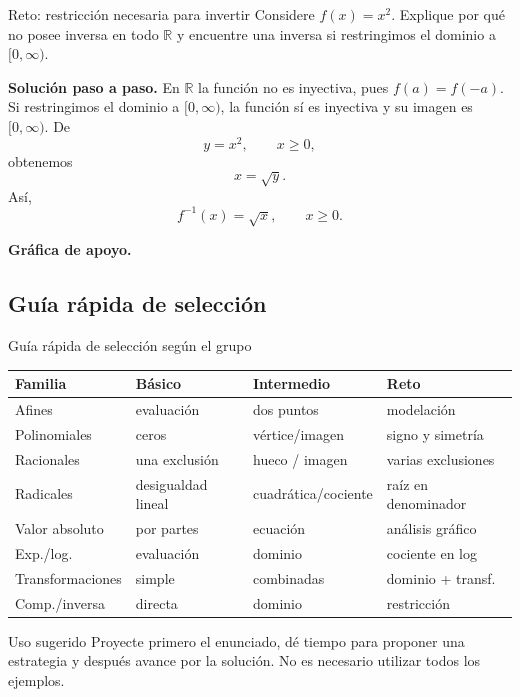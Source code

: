 \documentclass[aspectratio=169,10pt]{beamer}
\newcommand{\R}{\mathbb{R}}
\begin{document}
\begin{frame}{Reto: restricción necesaria para invertir}
Considere $f(x)=x^2$. Explique por qué no posee inversa en todo $\R$ y encuentre una inversa si restringimos el dominio a $[0,\infty)$.

\textbf{Solución paso a paso.} En $\R$ la función no es inyectiva, pues $f(a)=f(-a)$. Si restringimos el dominio a $[0,\infty)$, la función sí es inyectiva y su imagen es $[0,\infty)$. De
\[
y=x^2,\qquad x\ge0,
\]
obtenemos
\[
x=\sqrt{y}.
\]
Así,
\[
\boxed{f^{-1}(x)=\sqrt{x},\qquad x\ge0}.
\]


\textbf{Gráfica de apoyo.}\medskip
\begin{center}
\end{center}

\end{frame}

\subsection*{Guía rápida de selección}
\begin{frame}{Guía rápida de selección según el grupo}
\small
\begin{tabular}{p{}p{}p{}p{}}
\toprule
\textbf{Familia} & \textbf{Básico} & \textbf{Intermedio} & \textbf{Reto}\\
\midrule
Afines & evaluación & dos puntos & modelación\\
Polinomiales & ceros & vértice/imagen & signo y simetría\\
Racionales & una exclusión & hueco / imagen & varias exclusiones\\
Radicales & desigualdad lineal & cuadrática/cociente & raíz en denominador\\
Valor absoluto & por partes & ecuación & análisis gráfico\\
Exp./log. & evaluación & dominio & cociente en log\\
Transformaciones & simple & combinadas & dominio + transf.\\
Comp./inversa & directa & dominio & restricción\\
\bottomrule
\end{tabular}
\vspace{1ex}
\begin{block}{Uso sugerido}
Proyecte primero el enunciado, dé tiempo para proponer una estrategia y después avance por la solución. No es necesario utilizar todos los ejemplos.
\end{block}
\end{frame}
\end{document}
